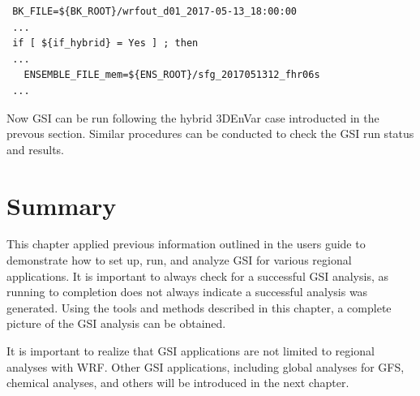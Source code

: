 \begin{scriptsize}
\begin{verbatim}
 BK_FILE=${BK_ROOT}/wrfout_d01_2017-05-13_18:00:00
 ...
 if [ ${if_hybrid} = Yes ] ; then
 ...
   ENSEMBLE_FILE_mem=${ENS_ROOT}/sfg_2017051312_fhr06s 
 ...
\end{verbatim}
\end{scriptsize}

Now GSI can be run following the hybrid 3DEnVar case introducted in the prevous section. Similar procedures can be conducted to check the GSI run status and results.

\section{Summary}

This chapter applied previous information outlined in the user\textquotesingle s guide to demonstrate how to set up, run, and analyze GSI for various regional applications.  It is important to always check for a successful GSI analysis, as running to completion does not always indicate a successful analysis was generated.  Using the tools and methods described in this chapter, a complete picture of the GSI analysis can be obtained. 

It is important to realize that GSI applications are not limited to regional analyses with WRF. Other GSI applications, including global analyses for GFS, chemical analyses, and others will be introduced in the next chapter.
